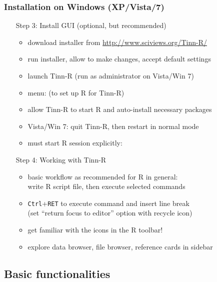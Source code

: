 \documentclass[t]{beamer} %
\begin{document}
\begin{frame}[fragile]
  \frametitle{Installation on Windows (XP/Vista/7)}
  
  \begin{itemize}
  \item[Step 3:] Install  GUI (optional, but recommended)
    \begin{itemize}
    \item download installer from \url{http://www.sciviews.org/Tinn-R/}
    \item run installer, allow to make changes, accept default settings
    \item launch Tinn-R (run as administrator on Vista/Win 7)
    \item menu:  (to set up R for Tinn-R)
    \item allow Tinn-R to start R and auto-install necessary packages
    \item Vista/Win 7: quit Tinn-R, then restart in normal mode
    \item must start R session explicitly: 
    \item[]
    \end{itemize}
    \pause
  \item[Step 4:] Working with Tinn-R
    \begin{itemize}
    \item basic workflow as recommended for R in general:\\
      write R script file, then execute selected commands
    \item \texttt{Ctrl}+\texttt{RET} to execute command and insert line break\\
      (set ``return focus to editor'' option with recycle icon)
    \item get familiar with the icons in the R toolbar!
    \item explore data browser, file browser, reference cards in sidebar
    \end{itemize}
  \end{itemize}
\end{frame}


\subsection{Basic functionalities}
\end{document}
